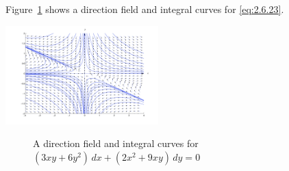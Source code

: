 \documentclass{ximera}
\begin{document}
\begin{example}
\begin{explanation}
Figure~\ref{figure:2.6.3} shows a direction field and integral curves for
\eqref{eq:2.6.23}.


\begin{image}
\includegraphics[height=1.5in]{fig020603.jpg}
\end{image}
\begin{center}
\begin{figure}
 \caption{
A direction field and integral curves for
$(3xy+6y^2)\,dx+(2x^2+9xy)\,dy=0$}
  \label{figure:2.6.3}
\end{figure}
\end{center}
\end{explanation}
\end{example}
\end{document}
